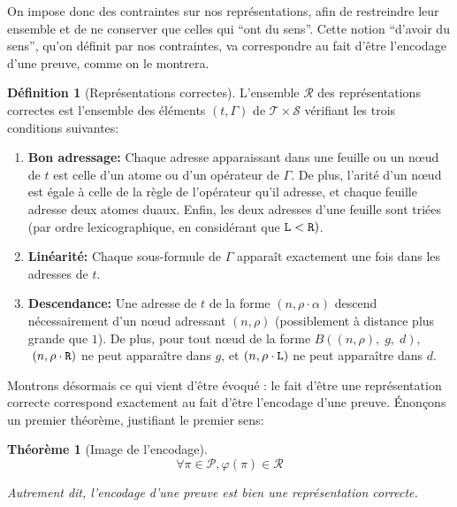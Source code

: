 \documentclass[11pt,a4paper]{article}
\theoremstyle{plain}
\newtheorem{theorem}{Théorème}
\theoremstyle{definition}
\newtheorem{definition}{Définition}
\theoremstyle{remark}
\newcommand*{\someadd}{\rho}
\newcommand*{\someproof}{\pi}
\newcommand*{\sequent}{\Gamma}
\newcommand*{\Left}{\textnormal{\texttt{L}}}
\newcommand*{\Right}{\textnormal{\texttt{R}}}
\newcommand*{\proofs}{\ensuremath{\mathcal{P}}}
\newcommand*{\sequents}{\ensuremath{\mathcal{S}}}
\newcommand*{\trees}{\ensuremath{\mathcal{T}}}
\newcommand*{\representationslarge}{\ensuremath{\trees \times \sequents}}
\newcommand*{\representations}{\ensuremath{\mathcal{R}}}
\newcommand*{\encode}{\ensuremath{\varphi}}
\begin{document}
On impose donc des contraintes sur nos représentations, afin de restreindre leur ensemble et de ne conserver que celles qui ``ont du sens''. Cette notion ``d'avoir du sens'', qu'on définit par nos contraintes, va correspondre au fait d'être l'encodage d'une preuve, comme on le montrera.

\begin{definition}[Représentations correctes]
    \label{def_rep}
    L'ensemble \representations{} des représentations correctes est l'ensemble des éléments $(t, \sequent)$ de $\representationslarge$ vérifiant les trois conditions suivantes:
    
    \begin{enumerate}
    \item\label{cadd} \textbf{Bon adressage:} Chaque adresse apparaissant dans une feuille ou un n\oe ud de $t$ est celle d'un atome ou d'un opérateur de $\sequent$. De plus, l'arité d'un n\oe ud est égale à celle de la règle de l'opérateur qu'il adresse, et chaque feuille adresse deux atomes duaux. Enfin, les deux adresses d'une feuille sont triées (par ordre lexicographique, en considérant que $\Left < \Right)$.
    \item\label{clin} \textbf{Linéarité:} Chaque sous-formule de $\sequent$ apparaît exactement une fois dans les adresses de $t$.
    \item\label{cdes} \textbf{Descendance:} Une adresse de $t$ de la forme $(n, \someadd \cdot \alpha)$ descend nécessairement d'un n\oe ud adressant $(n, \someadd)$ (possiblement à distance plus grande que $1$). De plus, pour tout n\oe ud de la forme $B((n, \someadd), \; g, \; d)$, $\; (n, \someadd \cdot \Right)$ ne peut apparaître dans $g$, et $(n, \someadd \cdot \Left)$ ne peut apparaître dans $d$.
    \end{enumerate}
\end{definition}

Montrons désormais ce qui vient d'être évoqué : le fait d'être une représentation correcte correspond exactement au fait d'être l'encodage d'une preuve. Énonçons un premier théorème, justifiant le premier sens:

\begin{theorem}[Image de l'encodage]
    \label{encode_img}
    \begin{equation*}
    \forall \someproof \in \proofs, \encode \left( \someproof \right) \in \representations
    \end{equation*}

    Autrement dit, l'encodage d'une preuve est bien une représentation correcte.
\end{theorem}
\end{document}
